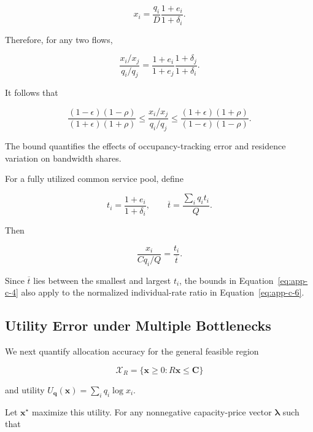 \begin{equation}
\label{eq:app-c-2}
x_i=\frac{q_i}{D}
\frac{1+e_i}{1+\delta_i}.
\end{equation}

Therefore, for any two flows,

\begin{equation}
\label{eq:app-c-3}
\boxed{
\frac{x_i/x_j}{q_i/q_j}
=
\frac{1+e_i}{1+e_j}
\frac{1+\delta_j}{1+\delta_i}.
}
\end{equation}

It follows that

\begin{equation}
\label{eq:app-c-4}
\boxed{
\frac{(1-\epsilon)(1-\rho)}
{(1+\epsilon)(1+\rho)}
\le
\frac{x_i/x_j}{q_i/q_j}
\le
\frac{(1+\epsilon)(1+\rho)}
{(1-\epsilon)(1-\rho)}.
}
\end{equation}

The bound quantifies the effects of occupancy-tracking error and residence variation on bandwidth shares.

For a fully utilized common service pool, define

\begin{equation}
\label{eq:app-c-5}
t_i=\frac{1+e_i}{1+\delta_i},
\qquad
\overline t=\frac{\sum_iq_it_i}{Q}.
\end{equation}

Then

\begin{equation}
\label{eq:app-c-6}
\boxed{
\frac{x_i}{Cq_i/Q}=\frac{t_i}{\overline t}.
}
\end{equation}

Since \(\overline t\) lies between the smallest and largest \(t_i\), the bounds in Equation~\eqref{eq:app-c-4} also apply to the normalized individual-rate ratio in Equation~\eqref{eq:app-c-6}.

\subsection{Utility Error under Multiple Bottlenecks}
\label{app:c-2}

We next quantify allocation accuracy for the general feasible region

\[
\mathcal X_R=\{\mathbf x\ge0:R\mathbf x\le\mathbf C\}
\]

and utility \(U_{\mathbf q}(\mathbf x)=\sum_iq_i\log x_i\).

Let \(\mathbf x^\star\) maximize this utility. For any nonnegative capacity-price vector \(\boldsymbol\lambda\) such that

